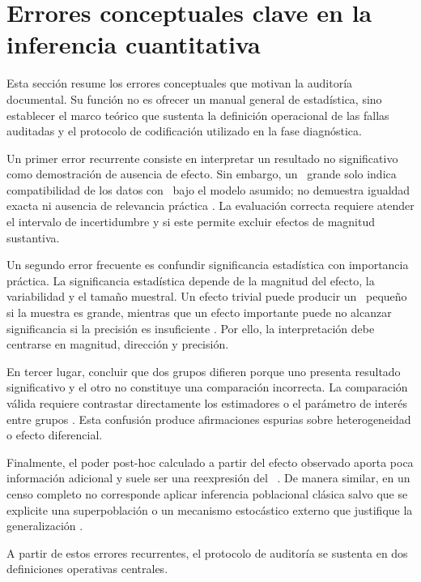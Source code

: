 \section{Errores conceptuales clave en la inferencia cuantitativa}
\label{sec:marcoteorico}

Esta sección resume los errores conceptuales que motivan la auditoría documental. Su función no es ofrecer un manual general de estadística, sino establecer el marco teórico que sustenta la definición operacional de las fallas auditadas y el protocolo de codificación utilizado en la fase diagnóstica.

Un primer error recurrente consiste en interpretar un resultado no significativo como demostración de ausencia de efecto. Sin embargo, un \pvalue\ grande solo indica compatibilidad de los datos con \Hnull\ bajo el modelo asumido; no demuestra igualdad exacta ni ausencia de relevancia práctica \citep{altman1995,schmidt2025}. La evaluación correcta requiere atender el intervalo de incertidumbre y si este permite excluir efectos de magnitud sustantiva.

Un segundo error frecuente es confundir significancia estadística con importancia práctica. La significancia estadística depende de la magnitud del efecto, la variabilidad y el tamaño muestral. Un efecto trivial puede producir un \pvalue\ pequeño si la muestra es grande, mientras que un efecto importante puede no alcanzar significancia si la precisión es insuficiente \citep{darrigo2024,mansournia2021}. Por ello, la interpretación debe centrarse en magnitud, dirección y precisión.

En tercer lugar, concluir que dos grupos difieren porque uno presenta resultado significativo y el otro no constituye una comparación incorrecta. La comparación válida requiere contrastar directamente los estimadores o el parámetro de interés entre grupos \citep{gelman2006}. Esta confusión produce afirmaciones espurias sobre heterogeneidad o efecto diferencial.

Finalmente, el poder post-hoc calculado a partir del efecto observado aporta poca información adicional y suele ser una reexpresión del \pvalue\ \citep{hoenig2001,thomas1997,reinhart2015}. De manera similar, en un censo completo no corresponde aplicar inferencia poblacional clásica salvo que se explicite una superpoblación o un mecanismo estocástico externo que justifique la generalización \citep{navarrete2019}.

A partir de estos errores recurrentes, el protocolo de auditoría se sustenta en dos definiciones operativas centrales.

